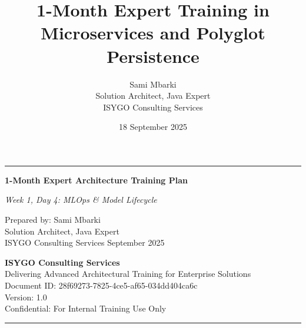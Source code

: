 \documentclass[11pt]{article}
\begin{document}
\begin{titlepage}
    \centering
    \vspace*{1cm}
    \vspace{0.5cm}
    {\color{primaryblue}\hrule height 2pt}
    \vspace{0.5cm}
    {\LARGE\sffamily\bfseries 1-Month Expert Architecture Training Plan\par}
    \vspace{0.3cm}
    {\large\sffamily\itshape Week 1, Day 4: MLOps \& Model Lifecycle\par}
    \vspace{1.5cm}
    {\large\sffamily Prepared by: Sami Mbarki \\ Solution Architect, Java Expert \\ ISYGO Consulting Services}
    \vspace{1cm}
    {\large{} September 2025}
    \vfill
    \begin{minipage}{0.8\textwidth}
        \centering
        \small\sffamily \textbf{ISYGO Consulting Services} \\
        \small\sffamily Delivering Advanced Architectural Training for Enterprise Solutions \\
        \vspace{0.5cm}
        \small\sffamily Document ID: 28f69273-7825-4ce5-af65-034dd404ca6c \\
        \small\sffamily Version: 1.0 \\
        \small\sffamily Confidential: For Internal Training Use Only
    \end{minipage}
    {\color{primaryblue}\hrule height 2pt}
\end{titlepage}

\pretitle{\begin{center}\LARGE\sffamily\bfseries}
\posttitle{\end{center}}
\preauthor{\begin{center}\large\sffamily}
\postauthor{\end{center}}
\predate{\begin{center}\large\sffamily}
\postdate{\end{center}}

\pagestyle{fancy}
\title{1-Month Expert Training in Microservices and Polyglot Persistence}
\author{Sami Mbarki \\ Solution Architect, Java Expert \\ ISYGO Consulting Services}
\date{18 September 2025}
\maketitle
\end{document}
